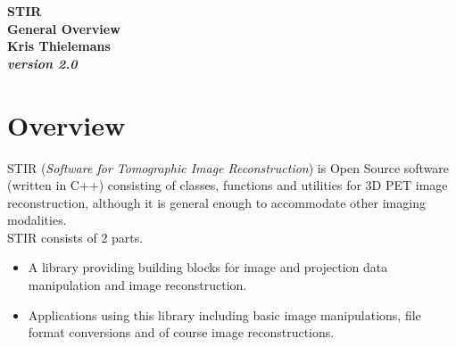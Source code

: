 \documentclass{article}
\begin{document}
\begin{center}

\begin{spacing}{1.5}
\textbf{{\huge STIR \\
General Overview}}\\
\textbf{Kris Thielemans}\\
\textbf{\textit{version 2.0}}


\end{spacing}

\end{center}

\tableofcontents 


\section{
Overview}

STIR (\textit{Software for Tomographic Image Reconstruction}) is Open 
Source software (written in C++) consisting of classes, functions 
and utilities for 3D PET image reconstruction, although it is 
general enough to accommodate other imaging modalities. \\
STIR consists of 2 parts. 
\begin{itemize}
\item
A library providing building blocks for image and projection 
data manipulation and image reconstruction.
\item
Applications using this library including basic image manipulations, 
file format conversions and of course image reconstructions.
\end{itemize}
\end{document}
